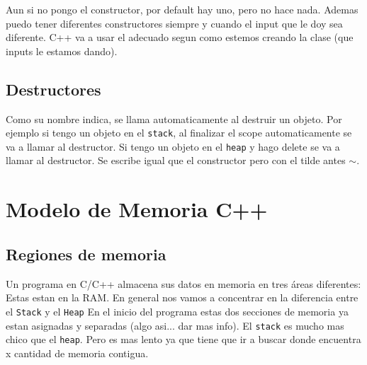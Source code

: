 \documentclass[11pt]{article}
\begin{document}
Aun si no pongo el constructor, por default hay uno, pero no hace nada.
Ademas puedo tener diferentes constructores siempre y cuando el input que le
doy sea diferente.
C++ va a usar el adecuado segun como estemos creando la clase (que inputs le
estamos dando).



\subsection{Destructores}
Como su nombre indica, se llama automaticamente al destruir un objeto.
Por ejemplo si tengo un objeto en el \texttt{stack}, al finalizar el scope automaticamente
se va a llamar al destructor.
Si tengo un objeto en el \texttt{heap} y hago delete se va a llamar al destructor.
Se escribe igual que el constructor pero con el tilde antes $\sim$.



\section{Modelo de Memoria C++}


\subsection{Regiones de memoria}
Un programa en C/C++ almacena sus datos en memoria en tres áreas diferentes:
Estas estan en la RAM.
En general nos vamos a concentrar en la diferencia entre el \texttt{Stack} y el \texttt{Heap}
En el inicio del programa estas dos secciones de memoria ya estan asignadas y
separadas (algo asi... dar mas info).
El \texttt{stack} es mucho mas chico que el \texttt{heap}.
Pero es mas lento ya que tiene que ir a buscar donde encuentra x cantidad de
memoria contigua.
\end{document}
